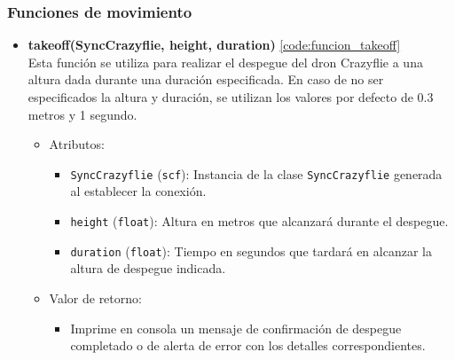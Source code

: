\subsubsection{Funciones de movimiento}
\begin{itemize}
		\item \textbf{takeoff(SyncCrazyflie, height, duration)} \ref{code:funcion_takeoff}\\ 
	Esta función se utiliza para realizar el despegue del dron Crazyflie a una altura dada durante una duración especificada. En caso de no ser especificados la altura y duración, se utilizan los valores por defecto de 0.3 metros y 1 segundo.
	\begin{itemize}
		\item Atributos:
		\begin{itemize}
			\item \texttt{SyncCrazyflie} (\texttt{scf}): Instancia de la clase \texttt{SyncCrazyflie} generada al establecer la conexión.
			\item \texttt{height} (\texttt{float}): Altura en metros que alcanzará durante el despegue. 
			\item \texttt{duration} (\texttt{float}): Tiempo en segundos que tardará en alcanzar la altura de despegue indicada.
		\end{itemize}
		\item Valor de retorno:
		\begin{itemize}
			\item Imprime en consola un mensaje de confirmación de despegue completado o de alerta de error con los detalles correspondientes.
		\end{itemize}
	\end{itemize} 
	\vspace{5mm} %
	

\end{itemize}
